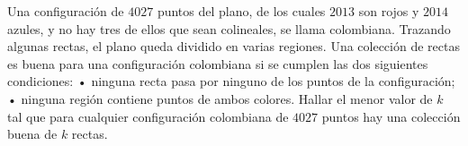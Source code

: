 Una configuración de $4027$ puntos del plano, de los cuales $2013$ son rojos y $2014$ azules, y no hay tres de ellos que sean colineales, se llama colombiana. Trazando algunas rectas, el plano queda dividido en varias regiones. Una colección de rectas es buena para una configuración colombiana si se cumplen las dos siguientes condiciones: \newline 
 • ninguna recta pasa por ninguno de los puntos de la configuración; \newline 
 • ninguna región contiene puntos de ambos colores. \newline 
Hallar el menor valor de $k$ tal que para cualquier configuración colombiana de $4027$ puntos hay una colección buena de $k$ rectas.